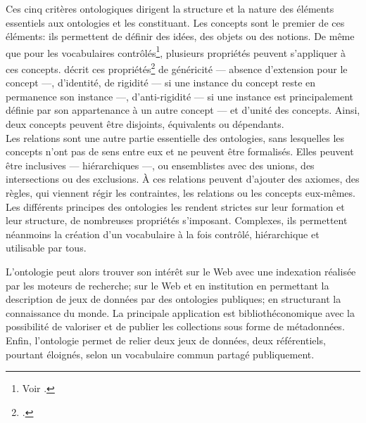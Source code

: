 Ces cinq critères ontologiques dirigent la structure et la nature des éléments essentiels aux ontologies et les constituant. Les concepts sont le premier de ces éléments: ils permettent de définir des idées, des objets ou des notions. De même que pour les vocabulaires contrôlés\footnote{Voir .}, plusieurs propriétés peuvent s'appliquer à ces concepts.  décrit ces propriétés\footcite{guarino_formal_1998} de généricité --- absence d'extension pour le concept ---, d'identité, de rigidité --- si une instance du concept reste en permanence son instance ---, d'anti-rigidité --- si une instance est principalement définie par son appartenance à un autre concept --- et d'unité des concepts. Ainsi, deux concepts peuvent être disjoints, équivalents ou dépendants.\\

Les relations sont une autre partie essentielle des ontologies, sans lesquelles les concepts n'ont pas de sens entre eux et ne peuvent être formalisés. Elles peuvent être inclusives --- hiérarchiques ---, ou ensemblistes avec des unions, des intersections ou des exclusions. À ces relations peuvent d'ajouter des axiomes, des règles, qui viennent régir les contraintes, les relations ou les concepts eux-mêmes.\\

Les différents principes des ontologies les rendent strictes sur leur formation et leur structure, de nombreuses propriétés s'imposant. Complexes, ils permettent néanmoins la création d'un vocabulaire à la fois contrôlé, hiérarchique et utilisable par tous.

\bigskip
\bigskip
L'ontologie peut alors trouver son intérêt sur le Web avec une indexation réalisée par les moteurs de recherche; sur le Web et en institution en permettant la description de jeux de données par des ontologies publiques; en structurant la connaissance du monde. La principale application est bibliothéconomique avec la possibilité de valoriser et de publier les collections sous forme de métadonnées. Enfin, l'ontologie permet de relier deux jeux de données, deux référentiels, pourtant éloignés, selon un vocabulaire commun partagé publiquement.